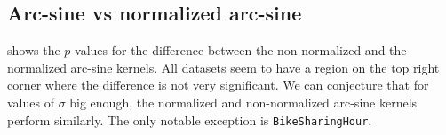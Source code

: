 %
%
%
%
%
%

\subsection{Arc-sine vs normalized arc-sine}

 shows the $p$-values for the difference between
the non normalized and the normalized arc-sine kernels. All datasets seem to have
a region on the top right corner where the difference is not very significant.
We can conjecture that for values of $\sigma$ big enough, the normalized and
non-normalized arc-sine kernels perform similarly. The only notable exception is
\texttt{BikeSharingHour}.

